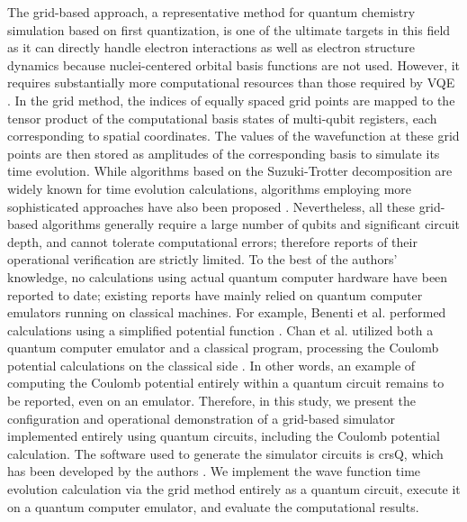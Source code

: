 \documentclass[aip-draft.tex]{subfiles}
\begin{document}
The grid-based approach, a representative method for quantum chemistry
simulation based on first quantization, is one of the ultimate targets in this
field as it can directly handle electron interactions as well as electron
structure dynamics because nuclei-centered orbital basis functions are not used.
However, it requires substantially more computational resources than those
required by VQE \cite{kassal2008.pnas.0808245105}. In the grid method, the
indices of equally spaced grid points are mapped to the tensor product of the
computational basis states of multi-qubit registers, each corresponding to
spatial coordinates. The values of the wavefunction at these grid points are
then stored as amplitudes of the corresponding basis to simulate its time
evolution. While algorithms based on the Suzuki-Trotter decomposition are widely
known for time evolution calculations, algorithms employing more sophisticated
approaches have also been proposed \cite{Berry2015.PhysRevLett.114.090502,
Babbush_2018, YuanSu.PRXQuantum.2.040332, eklund2026.arXiv2603.19007}.
Nevertheless, all these grid-based algorithms generally require a
large number of qubits and significant circuit depth, and cannot tolerate
computational errors; therefore reports of their operational verification are strictly
limited. To the best of the authors' knowledge, no calculations using actual
quantum computer hardware have been reported to date; existing reports have
mainly relied on quantum computer emulators running on classical machines. For example,
Benenti et al. performed calculations using a simplified potential function
\cite{Benenti2008.10.1119/1.2894532}. Chan et al. utilized both a quantum
computer emulator and a classical program, processing the Coulomb potential
calculations on the classical side \cite{Chan2023.sciadv.abo7484}. In other
words, an example of computing the Coulomb potential entirely within a quantum
circuit remains to be reported, even on an emulator. Therefore, in this
study, we present the configuration and operational demonstration of a
grid-based simulator implemented entirely using quantum circuits, including the
Coulomb potential calculation. The software used to generate the simulator
circuits is crsQ, which has been developed by the authors
\cite{takahashi2024.doi:10.1021/acs.jctc.4c00708}. We implement the wave
function time evolution calculation via the grid method entirely as a quantum
circuit, execute it on a quantum computer emulator, and evaluate the
computational results.
\end{document}
